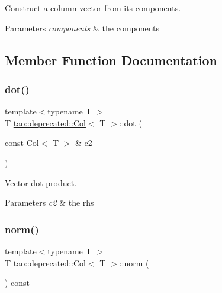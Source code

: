 Construct a column vector from its components. 


\begin{DoxyParams}{Parameters}
{\em components} & the components \\
\hline
\end{DoxyParams}


\subsection{Member Function Documentation}
\mbox{\label{classtao_1_1deprecated_1_1_col_ab1070d68d4b4570bcf7865f91178dd22}} 
\subsubsection{\texorpdfstring{dot()}{dot()}}
{\footnotesize\ttfamily template$<$typename T $>$ \\
T \mbox{\hyperlink{classtao_1_1deprecated_1_1_col}{tao\+::deprecated\+::\+Col}}$<$ T $>$\+::dot (\begin{DoxyParamCaption}\item[{const \mbox{\hyperlink{classtao_1_1deprecated_1_1_col}{Col}}$<$ T $>$ \&}]{c2 }\end{DoxyParamCaption})}



Vector dot product. 


\begin{DoxyParams}{Parameters}
{\em c2} & the rhs \\
\hline
\end{DoxyParams}
\mbox{\label{classtao_1_1deprecated_1_1_col_a8501c1119f984d66f4a9172fa079bf6a}} 
\subsubsection{\texorpdfstring{norm()}{norm()}}
{\footnotesize\ttfamily template$<$typename T $>$ \\
T \mbox{\hyperlink{classtao_1_1deprecated_1_1_col}{tao\+::deprecated\+::\+Col}}$<$ T $>$\+::norm (\begin{DoxyParamCaption}{ }\end{DoxyParamCaption}) const}



